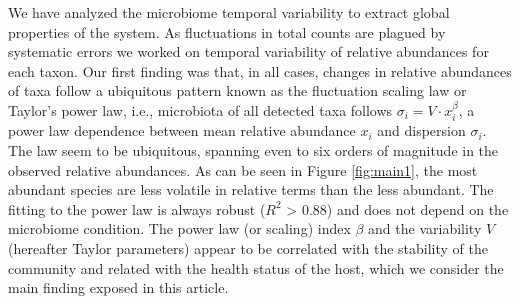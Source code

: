 
We have analyzed the microbiome temporal variability to extract global properties of the system. As fluctuations in total counts are plagued by systematic errors we worked on temporal variability of relative abundances for each taxon. Our first finding was that, in all cases, changes in relative abundances of taxa follow a ubiquitous pattern known as the fluctuation scaling law\cite{fs} or Taylor's power law\cite{taylor}, i.e., microbiota of all detected taxa follows $\sigma_i  = V\cdot x_i^{\beta}$, a power law dependence between mean relative abundance $x_i$ and dispersion $\sigma_i$. The law seem to be ubiquitous, spanning even to six orders of magnitude in the observed relative abundances. As can be seen in Figure \ref{fig:main1}, the most abundant species are less volatile in relative terms than the less abundant. The fitting to the power law is always robust ($R^{2}$ > 0.88) and does not depend on the microbiome condition. The power law (or scaling) index $\beta$ and the variability $V$ (hereafter Taylor parameters) appear to be correlated with the stability of the community and related with the health status of the host, which we consider the main finding exposed in this article.

